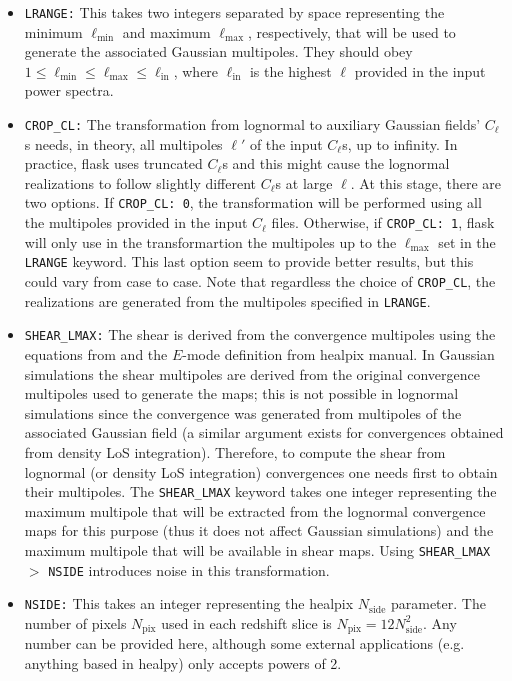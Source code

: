\documentclass[12pt]{book} %
\newcommand{\nv}[1]{\mathrm{#1}}                 %
\begin{document}
\begin{itemize}
\item {\tt LRANGE:} This takes two integers separated by space representing the minimum 
  $\ell_{\nv{min}}$ and maximum $\ell_{\nv{max}}$, respectively, that will be used to generate the 
  associated Gaussian multipoles. They should obey $1 \leq \ell_{\nv{min}} \leq \ell_{\nv{max}} \leq \ell_{\nv{in}}$, 
  where $\ell_{\nv{in}}$ is the highest $\ell$ provided in the input power spectra.

\item {\tt CROP\_CL:} The transformation from lognormal to auxiliary Gaussian fields' $C_\ell$s
  \citep[Eq. 21]{Xavier16mn} needs, in theory, all multipoles $\ell'$ of the input $C_\ell$s, up to 
  infinity. In practice, {\sc flask} uses truncated $C_\ell$s and this might cause the lognormal realizations  
  to follow slightly different $C_\ell$s at large $\ell$. At this stage, there are two options. 
  If {\tt CROP\_CL: 0}, the transformation will be performed using all the multipoles provided in the 
  input $C_\ell$ files. Otherwise, if {\tt CROP\_CL: 1}, {\sc flask} will only use in the transformartion 
  the multipoles up to the $\ell_{\nv{max}}$ set in the {\tt LRANGE} keyword. This last option seem to 
  provide better results, but this could vary from case to case. Note that regardless the choice of 
  {\tt CROP\_CL}, the realizations are generated from the multipoles specified in {\tt LRANGE}. 

\item {\tt SHEAR\_LMAX:} The shear is derived from the convergence multipoles using the equations 
  from \citet{Hu00x} and the $E$-mode definition from {\sc healpix} manual. In Gaussian simulations 
  the shear multipoles are derived from the original convergence multipoles used to generate the maps; 
  this is not possible in lognormal simulations since the convergence was generated from multipoles of the 
  associated Gaussian field (a similar argument exists for convergences obtained from density LoS integration). 
  Therefore, to compute the shear from lognormal (or density LoS integration) convergences one needs first to 
  obtain their multipoles. The {\tt SHEAR\_LMAX} keyword takes one integer representing 
  the maximum multipole that will be extracted from the lognormal convergence maps for this purpose (thus it 
  does not affect Gaussian simulations) and the maximum multipole that will be available in shear maps. 
  Using {\tt SHEAR\_LMAX} $>$ {\tt NSIDE} introduces noise in this transformation.
  
\item {\tt NSIDE:} This takes an integer representing the {\sc healpix} $N_{\nv{side}}$ parameter. 
  The number of pixels $N_{\nv{pix}}$ used in each redshift slice is $N_{\nv{pix}}=12N_{\nv{side}}^2$. 
  Any number can be provided here, although some external applications (e.g. anything based 
  in {\sc healpy}) only accepts powers of 2.


\end{itemize}
\end{document}
